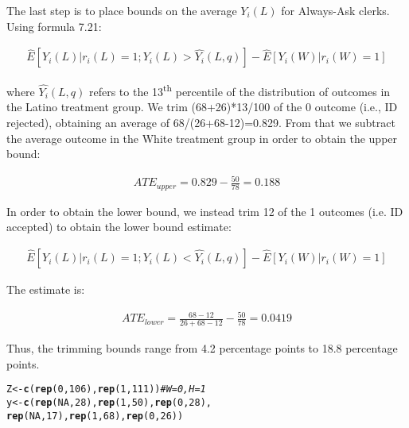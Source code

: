 \documentclass[11pt,notitlepage]{article}\usepackage[]{graphicx}\usepackage[]{color}
\makeatletter
\newcommand{\hlnum}[1]{\textcolor[rgb]{0.686,0.059,0.569}{#1}}%
\newcommand{\hlcom}[1]{\textcolor[rgb]{0.678,0.584,0.686}{\textit{#1}}}%
\newcommand{\hlstd}[1]{\textcolor[rgb]{0.345,0.345,0.345}{#1}}%
\newcommand{\hlkwb}[1]{\textcolor[rgb]{0.69,0.353,0.396}{#1}}%
\newcommand{\hlkwd}[1]{\textcolor[rgb]{0.737,0.353,0.396}{\textbf{#1}}}%
\newenvironment{kframe}{%
 \def\at@end@of@kframe{}%
 \ifinner\ifhmode%
  \def\at@end@of@kframe{\end{minipage}}%
  \begin{minipage}{\columnwidth}%
 \fi\fi%
 \def\FrameCommand##1{\hskip\@totalleftmargin \hskip-\fboxsep
 \colorbox{shadecolor}{##1}\hskip-\fboxsep
     \hskip-\linewidth \hskip-\@totalleftmargin \hskip\columnwidth}%
 \MakeFramed {\advance\hsize-\width
   \@totalleftmargin\z@ \linewidth\hsize
   \@setminipage}}%
 {\par\unskip\endMakeFramed%
 \at@end@of@kframe}
\newenvironment{knitrout}{}{} %
\makeatother
\begin{document}
\begin{enumerate}[a)]
The last step is to place bounds on the average $Y_i (L)$ for Always-Ask clerks.  Using formula 7.21:

\begin{align*}
\hat{E}[Y_i(L)|r_i(L)=1; Y_i(L) > \hat{Y_i}(L,q)] - \hat{E}[Y_i(W) | r_i(W)=1]
\end{align*}

where $\hat{Y_i}(L,q)$ refers to the 13\textsuperscript{th} percentile of the distribution of outcomes in the Latino treatment group. We trim (68+26)*13/100 of the 0 outcome (i.e., ID rejected), obtaining an average of 68/(26+68-12)=0.829. From that we subtract the average outcome in the White treatment group in order to obtain the upper bound: 

\begin{align*}
ATE_{upper} = 0.829 - \frac{50}{78} = 0.188
\end{align*}

In order to obtain the lower bound, we instead trim 12 of the 1 outcomes (i.e. ID accepted) to obtain the lower bound estimate:

\begin{align*}
\hat{E}[Y_i(L)|r_i(L)=1; Y_i(L) < \hat{Y_i}(L,q)] - \hat{E}[Y_i(W) | r_i(W)=1]
\end{align*}

The estimate is:

\begin{align*}
ATE_{lower} =\frac{68-12}{26+68-12} - \frac{50}{78} = 0.0419
\end{align*}

Thus, the trimming bounds range from 4.2 percentage points to 18.8 percentage points.

\begin{knitrout}
\color{fgcolor}\begin{kframe}
\begin{alltt}
\hlstd{Z} \hlkwb{<-} \hlkwd{c}\hlstd{(}\hlkwd{rep}\hlstd{(}\hlnum{0}\hlstd{,} \hlnum{106}\hlstd{),} \hlkwd{rep}\hlstd{(}\hlnum{1}\hlstd{,} \hlnum{111}\hlstd{))} \hlcom{#W =0, H=1}
\hlstd{y} \hlkwb{<-} \hlkwd{c}\hlstd{(}\hlkwd{rep}\hlstd{(}\hlnum{NA}\hlstd{,} \hlnum{28}\hlstd{),} \hlkwd{rep}\hlstd{(}\hlnum{1}\hlstd{,} \hlnum{50}\hlstd{),} \hlkwd{rep}\hlstd{(}\hlnum{0}\hlstd{,} \hlnum{28}\hlstd{),}
       \hlkwd{rep}\hlstd{(}\hlnum{NA}\hlstd{,} \hlnum{17}\hlstd{),} \hlkwd{rep}\hlstd{(}\hlnum{1}\hlstd{,}\hlnum{68}\hlstd{),} \hlkwd{rep}\hlstd{(}\hlnum{0}\hlstd{,} \hlnum{26}\hlstd{))}


\end{alltt}
\end{kframe}
\end{knitrout}
\end{enumerate}
\end{document}
